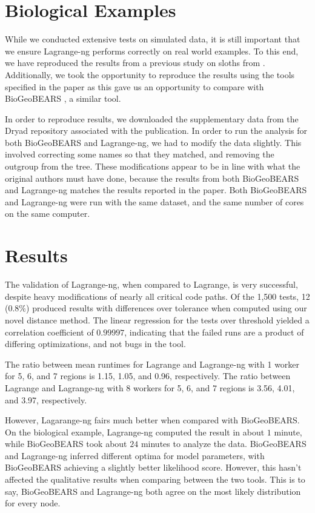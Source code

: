 \documentclass[oupdraft]{sysbio}
\begin{document}
\section{Biological Examples}\label{sec:bio-examples}

While we conducted extensive tests on simulated data, it is still important that we ensure Lagrange-ng performs
correctly on real world examples. To this end, we have reproduced the results from a previous study on sloths from
\citet{varela_phylogeny_2019}. Additionally, we took the opportunity to reproduce the results using the tools specified
in the paper as this gave us an opportunity to compare with BioGeoBEARS \citep{biogeobears}, a similar tool.

In order to reproduce results, we downloaded the supplementary data from the Dryad repository associated with the
publication. In order to run the analysis for both BioGeoBEARS and Lagrange-ng, we had to modify the data slightly. This
involved correcting some names so that they matched, and removing the outgroup from the tree. These modifications appear
to be in line with what the original authors must have done, because the results from both BioGeoBEARS and Lagrange-ng
matches the results reported in the paper. Both BioGeoBEARS and Lagrange-ng were run with the same dataset, and the same
number of cores on the same computer.

\section{Results}\label{sec:Results}

The validation of Lagrange-ng, when compared to Lagrange, is very successful, despite heavy modifications of nearly all
critical code paths. Of the 1,500 tests, 12 ($0.8\%$) produced results with differences over tolerance when computed
using our novel distance method. The linear regression for the tests over threshold yielded a correlation coefficient of
$0.99997$, indicating that the failed runs are a product of differing optimizations, and not bugs in the tool.

The ratio between mean runtimes for Lagrange and Lagrange-ng with 1 worker for 5, 6, and 7 regions is 1.15, 1.05, and
0.96, respectively. The ratio between Lagrange and Lagrange-ng with 8 workers for 5, 6, and 7 regions is 3.56, 4.01, and
3.97, respectively.

However, Lagarange-ng fairs much better when compared with BioGeoBEARS. On the biological example, Lagrange-ng computed
the result in about $1$ minute, while BioGeoBEARS took about $24$ minutes to analyze the data. BioGeoBEARS and
Lagrange-ng inferred different optima for model parameters, with BioGeoBEARS achieving a slightly better likelihood
score. However, this hasn't affected the qualitative results when comparing between the two tools. This is to say,
BioGeoBEARS and Lagrange-ng both agree on the most likely distribution for every node.
\end{document}
